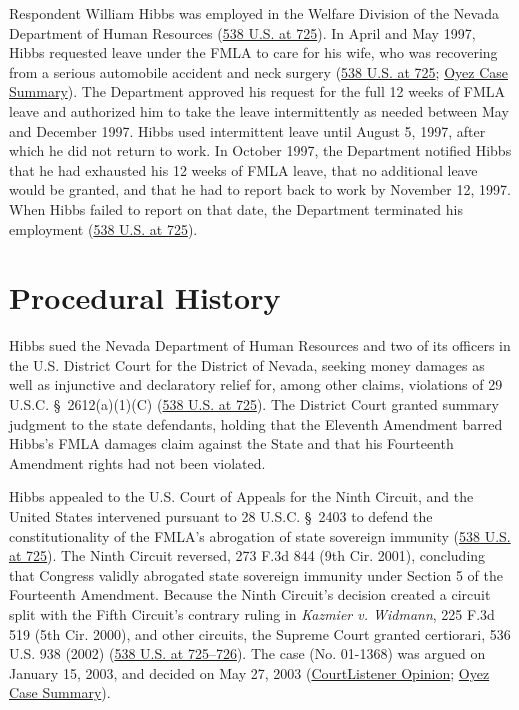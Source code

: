 \documentclass[12pt]{article}
\begin{document}
Respondent William Hibbs was employed in the Welfare Division of the Nevada Department of Human Resources (\href{https://supreme.justia.com/cases/federal/us/538/721/}{538 U.S. at 725}). In April and May 1997, Hibbs requested leave under the FMLA to care for his wife, who was recovering from a serious automobile accident and neck surgery (\href{https://supreme.justia.com/cases/federal/us/538/721/}{538 U.S. at 725}; \href{https://www.oyez.org/cases/2002/01-1368}{Oyez Case Summary}). The Department approved his request for the full 12 weeks of FMLA leave and authorized him to take the leave intermittently as needed between May and December 1997. Hibbs used intermittent leave until August 5, 1997, after which he did not return to work. In October 1997, the Department notified Hibbs that he had exhausted his 12 weeks of FMLA leave, that no additional leave would be granted, and that he had to report back to work by November 12, 1997. When Hibbs failed to report on that date, the Department terminated his employment (\href{https://supreme.justia.com/cases/federal/us/538/721/}{538 U.S. at 725}).

\section{Procedural History}
Hibbs sued the Nevada Department of Human Resources and two of its officers in the U.S. District Court for the District of Nevada, seeking money damages as well as injunctive and declaratory relief for, among other claims, violations of 29 U.S.C. \S~2612(a)(1)(C) (\href{https://supreme.justia.com/cases/federal/us/538/721/}{538 U.S. at 725}). The District Court granted summary judgment to the state defendants, holding that the Eleventh Amendment barred Hibbs's FMLA damages claim against the State and that his Fourteenth Amendment rights had not been violated.

Hibbs appealed to the U.S. Court of Appeals for the Ninth Circuit, and the United States intervened pursuant to 28 U.S.C. \S~2403 to defend the constitutionality of the FMLA's abrogation of state sovereign immunity (\href{https://supreme.justia.com/cases/federal/us/538/721/}{538 U.S. at 725}). The Ninth Circuit reversed, 273 F.3d 844 (9th Cir. 2001), concluding that Congress validly abrogated state sovereign immunity under Section 5 of the Fourteenth Amendment. Because the Ninth Circuit's decision created a circuit split with the Fifth Circuit's contrary ruling in \textit{Kazmier v. Widmann}, 225 F.3d 519 (5th Cir. 2000), and other circuits, the Supreme Court granted certiorari, 536 U.S. 938 (2002) (\href{https://supreme.justia.com/cases/federal/us/538/721/}{538 U.S. at 725--726}). The case (No. 01-1368) was argued on January 15, 2003, and decided on May 27, 2003 (\href{https://www.courtlistener.com/opinion/127926/nevada-department-of-human-resources-v-hibbs/}{CourtListener Opinion}; \href{https://www.oyez.org/cases/2002/01-1368}{Oyez Case Summary}).
\end{document}
